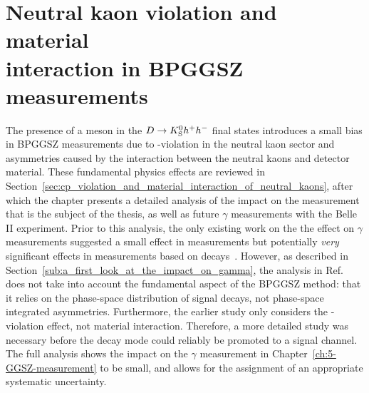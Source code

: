 

\chapter{\texorpdfstring{Neutral kaon \CP violation and material\\interaction in BPGGSZ measurements}{Neutral kaon CP violation and material interaction in BPGGSZ measurements}}
\label{ch:4-KS-CPV}

The presence of a \KS meson in the ${D}\rightarrow{\ensuremath{{K}^0_{\mathrm{S}}}} h^+h^-$ final states introduces a small bias in BPGGSZ measurements due to \CP-violation in the neutral kaon sector and asymmetries caused by the interaction between the neutral kaons and detector material. These fundamental physics effects are reviewed in Section~\ref{sec:cp_violation_and_material_interaction_of_neutral_kaons}, after which the chapter presents a detailed analysis of the impact on the \lhcb measurement that is the subject of the thesis,  as well as future $\gamma$ measurements with the Belle II experiment. 
Prior to this analysis, the only existing work on the the effect on $\gamma$ measurements suggested a small effect in \BtoDK measurements but potentially \emph{very} significant effects in measurements based on \BtoDpi decays~\cite{grossmanEffectsBarMixing2014}. However, as described in Section~\ref{sub:a_first_look_at_the_impact_on_gamma}, the analysis in Ref.~\cite{grossmanEffectsBarMixing2014} does not take into account the fundamental aspect of the BPGGSZ method: that it relies on the phase-space distribution of signal decays, not phase-space integrated asymmetries. Furthermore, the earlier study only considers the \CP-violation effect, not material interaction. Therefore, a more detailed study was necessary before the \BtoDpi decay mode could reliably be promoted to a signal channel. The full analysis shows the impact on the $\gamma$ measurement in Chapter~\ref{ch:5-GGSZ-measurement} to be small, and allows for the assignment of an appropriate systematic uncertainty.



